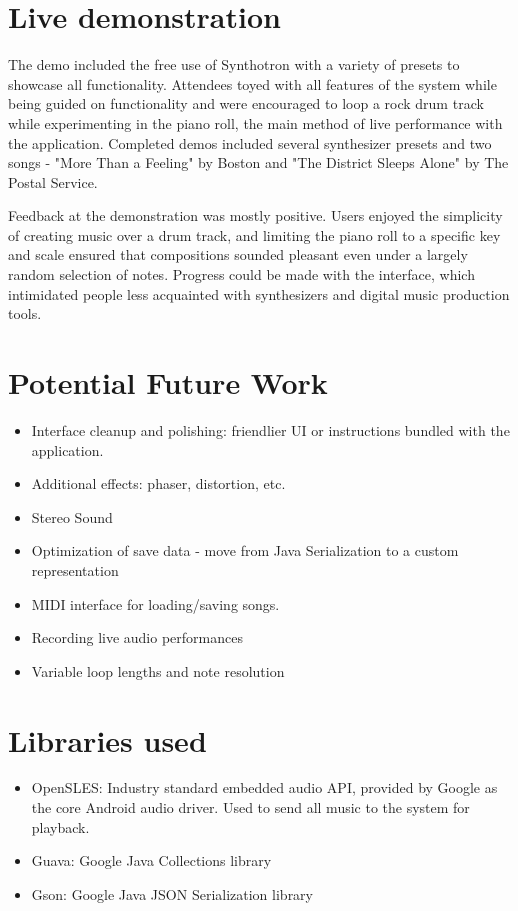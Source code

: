 \documentclass[letterpaper,12pt]{article}
\begin{document}
\section{Live demonstration}
The demo included the free use of Synthotron with a variety of presets to showcase all functionality. Attendees toyed with all features of the system while being guided on functionality and were encouraged to loop a rock drum track while experimenting in the piano roll, the main method of live performance with the application. Completed demos included several synthesizer presets and two songs - "More Than a Feeling" by Boston and "The District Sleeps Alone" by The Postal Service.

Feedback at the demonstration was mostly positive. Users enjoyed the simplicity of creating music over a drum track, and limiting the piano roll to a specific key and scale ensured that compositions sounded pleasant even under a largely random selection of notes. Progress could be made with the interface, which intimidated people less acquainted with synthesizers and digital music production tools. 

\section{Potential Future Work}
\begin{itemize}
  \item Interface cleanup and polishing: friendlier UI or instructions bundled with the application. 
  \item Additional effects: phaser, distortion, etc.
  \item Stereo Sound
  \item Optimization of save data - move from Java Serialization to a custom representation
  \item MIDI interface for loading/saving songs.
  \item Recording live audio performances
  \item Variable loop lengths and note resolution
\end{itemize}

\section{Libraries used}
\begin{itemize}
    \item OpenSLES: Industry standard embedded audio API, provided by Google as the core Android audio driver. Used to send all music to the system for playback. \cite{opensles}
    \item Guava: Google Java Collections library \cite{guava}
    \item Gson: Google Java JSON Serialization library \cite{gson}
\end{itemize}
\end{document}
